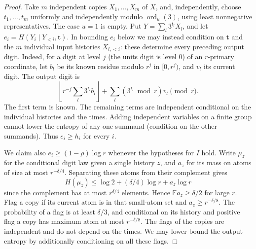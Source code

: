 \begin{proof}
Take $m$ independent copies $X_1,\ldots,X_m$ of $X$, and, independently,
choose $t_1,\ldots,t_m$ uniformly and independently modulo
$\operatorname{ord}_u(3)$, using least nonnegative representatives.
The case $u=1$ is empty. Put $Y=\sum_l3^{t_l}X_l$, and let
$e_i=H(Y_i\mid Y_{<i},\boldsymbol t)$. In bounding $e_i$ below we may
instead condition on $\boldsymbol t$ and the $m$ individual input
histories $X_{l,<i}$: these determine every preceding output digit.
Indeed, for a digit at level $j$ (the units digit is level $0$) of
an $r$-primary coordinate, let $b_l$ be its known residue modulo $r^j$
in $[0,r^j)$, and $v_l$ its current digit. The output digit is
\[
 \left\lfloor r^{-j}\sum_l3^{t_l}b_l\right\rfloor+
 \sum_l(3^{t_l}\bmod r)v_l \pmod r .
\]
The first term is known. The remaining terms are independent conditional
on the individual histories and the times. Adding independent variables
on a finite group cannot lower the entropy of any one summand
(condition on the other summands). Thus $e_i\ge h_i$ for every $i$.

We claim also $e_i\ge(1-\rho)\log r$ whenever the hypotheses for $I$
hold. Write $\mu_z$ for the conditional digit law given a single history
$z$, and $a_z$ for its mass on atoms of size at most $r^{-\delta/4}$.
Separating these atoms from their complement gives
\[
 H(\mu_z)\le\log 2+(\delta/4)\log r+a_z\log r
\]
since the complement has at most $r^{\delta/4}$ elements.
Hence $\mathbb E a_z\ge\delta/2$ for large $r$. Flag a copy if its
current atom is in that small-atom set and $a_z\ge r^{-\delta/8}$.
The probability of a flag is at least $\delta/3$, and conditional on
its history and positive flag a copy has maximum atom at most
$r^{-\delta/8}$. The flags of the copies are independent and do not
depend on the times. We may lower bound the output entropy by
additionally conditioning on all these flags.


\end{proof}
